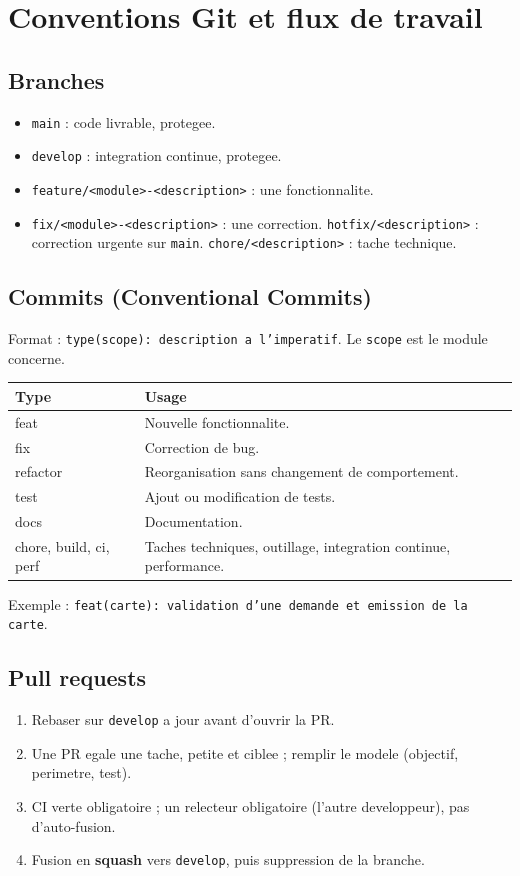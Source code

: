 \documentclass[11pt]{article}
\begin{document}
\section{Conventions Git et flux de travail}

\subsection{Branches}
\begin{itemize}
  \item \texttt{main} : code livrable, protegee.
  \item \texttt{develop} : integration continue, protegee.
  \item \texttt{feature/<module>-<description>} : une fonctionnalite.
  \item \texttt{fix/<module>-<description>} : une correction. \texttt{hotfix/<description>} : correction urgente sur \texttt{main}. \texttt{chore/<description>} : tache technique.
\end{itemize}

\subsection{Commits (Conventional Commits)}
Format : \texttt{type(scope): description a l'imperatif}. Le \texttt{scope} est le module concerne.
\begin{center}
\renewcommand{\arraystretch}{1.25}
\begin{tabularx}{\linewidth}{>{\ttfamily}l Y}
\toprule
{} \textmd{\bfseries Type} & Usage \\
\midrule
feat     & Nouvelle fonctionnalite. \\
fix      & Correction de bug. \\
refactor & Reorganisation sans changement de comportement. \\
test     & Ajout ou modification de tests. \\
docs     & Documentation. \\
chore, build, ci, perf & Taches techniques, outillage, integration continue, performance. \\
\bottomrule
\end{tabularx}
\end{center}
Exemple : \texttt{feat(carte): validation d'une demande et emission de la carte}.

\subsection{Pull requests}
\begin{enumerate}
  \item Rebaser sur \texttt{develop} a jour avant d'ouvrir la PR.
  \item Une PR egale une tache, petite et ciblee ; remplir le modele (objectif, perimetre, test).
  \item CI verte obligatoire ; un relecteur obligatoire (l'autre developpeur), pas d'auto-fusion.
  \item Fusion en \textbf{squash} vers \texttt{develop}, puis suppression de la branche.
\end{enumerate}
\end{document}
